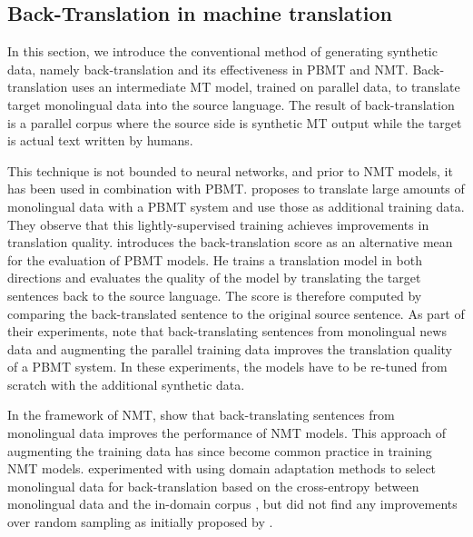 \subsection{Back-Translation in machine translation} \label{bgbtref}

In this section, we introduce the conventional method of generating synthetic data, namely back-translation and its effectiveness in PBMT and NMT.
Back-translation uses an intermediate MT model, trained on parallel data, to translate target monolingual data into the source language.
The result of back-translation is a parallel corpus where the source side is synthetic MT output while the target is actual text written by humans.

This technique is not bounded to neural networks, and prior to NMT models, it has been used in combination with PBMT. 
\citet{Schwenk2008InvestigationsOL} proposes to translate large amounts of monolingual data with a PBMT system and use those as additional training data. They observe that this lightly-supervised training achieves improvements in translation quality.
\citet{Rapp:2009:BSA:1667583.1667625} introduces the back-translation score as an alternative mean for the evaluation of PBMT models.
He trains a translation model in both directions and evaluates the quality of the model by translating the target sentences back to the source language. 
The score is therefore computed by comparing the back-translated sentence to the original source sentence. 
As part of their experiments, \citet{tiedemann-etal-2016-phrase} note that back-translating sentences from monolingual news data and augmenting the parallel training data improves the translation quality of a PBMT system. 
In these experiments, the models have to be re-tuned from scratch with the additional synthetic data.

In the framework of NMT, \citet{sennrich-haddow-birch:2016:P16-11} show that back-translating sentences from monolingual data improves the performance of NMT models. 
This approach of augmenting the training data has since become common practice in training NMT models. 
\citet{pham2017karlsruhe} experimented with using domain adaptation methods to select monolingual data for back-translation based on the cross-entropy between monolingual data and the in-domain corpus \citep{axelrod2015class}, 
but did not find any improvements over random sampling as initially proposed by \citet{sennrich-haddow-birch:2016:P16-11}.

